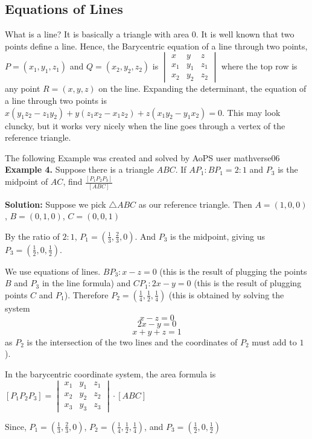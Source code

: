 \documentclass{article}
\begin{document}
\subsection{Equations of Lines}
What is a line? It is basically a triangle with area $0$. It is well known that two points define a line. Hence, the Barycentric equation of a line through two points, $P=(x_1,y_1,z_1)$ and $Q=(x_2,y_2,z_2)$ is $\begin{vmatrix}
x &y  &z \\ 
x_{1} &y_{1}  &z_{1} \\ 
 x_{2}& y_{2} & z_{2}
\end{vmatrix}$ where the top row is any point $R=(x,y,z)$ on the line. Expanding the determinant, the equation of a line through two points is $x(y_1z_2 -z_1y_2)+y(z_1x_2-x_1z_2)+z(x_1y_2-y_1x_2)=0$. This may look cluncky, but it works very nicely when the line goes through a vertex of the reference triangle.
\vspace{.2in}

The following Example was created and solved by AoPS user mathverse06
\textbf{Example 4.} Suppose there is a triangle $ABC$. If $AP_1:BP_1=2:1$ and $P_3$ is the midpoint of $AC$,
find $\frac{[P_{1}P_{2}P_{3}]}{[ABC]}$

\textbf{Solution:} Suppose we pick $\bigtriangleup ABC$ as our reference triangle. Then $A=(1,0,0)$ , $B=(0,1,0)$, $C=(0,0,1)$

By the ratio of $2:1$, $P_{1}=(\frac{1}{3},\frac{2}{3},0)$. And $P_3$ is the midpoint, giving us $P_3=(\frac{1}{2},0,\frac{1}{2})$.

We use equations of lines. $BP_3: x-z=0$ (this is the result of plugging the points $B$ and $P_3$ in the line formula) and $CP_1:2x-y=0$ (this is the result of plugging points $C$ and $P_1$). Therefore $P_2=(\frac{1}{4},\frac{1}{2},\frac{1}{4})$ (this is obtained by solving the system $$x-z=0$$ $$2x-y=0$$ $$x+y+z=1$$ as $P_2$ is the intersection of the two lines and the coordinates of $P_2$ must add to $1$).

In the barycentric coordinate system, the area formula is $[P_{1}P_{2}P_{3}]=\begin{vmatrix}
x_{1} &y_{1}  &z_{1} \\ 
x_{2} &y_{2}  &z_{2} \\ 
 x_{3}& y_{3} & z_{3}
\end{vmatrix}\cdot [ABC]$

Since, $P_{1}=(\frac{1}{3},\frac{2}{3},0)$, $P_2=(\frac{1}{4},\frac{1}{2},\frac{1}{4})$, and $P_3=(\frac{1}{2},0,\frac{1}{2})$
\end{document}
